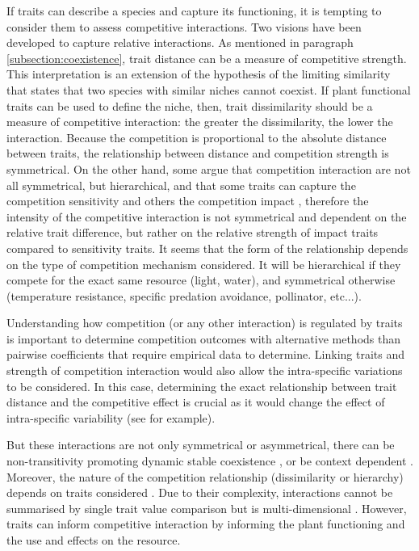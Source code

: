 If traits can describe a species and capture its functioning, it is tempting to consider them to assess competitive interactions. Two visions have been developed to capture relative interactions. As mentioned in paragraph \ref{subsection:coexistence}, trait distance can be a measure of competitive strength. This interpretation is an extension of the hypothesis of the limiting similarity that states that two species with similar niches cannot coexist. If plant functional traits can be used to define the niche, then, trait dissimilarity should be a measure of competitive interaction: the greater the dissimilarity, the lower the interaction. Because the competition is proportional to the absolute distance between traits, the relationship between distance and competition strength is symmetrical. On the other hand, some argue that competition interaction are not all symmetrical, but hierarchical, and that some traits can capture the competition sensitivity and others the competition impact \parencite{kunstler_plant_2016}, therefore the intensity of the competitive interaction is not symmetrical and dependent on the relative trait difference, but rather on the relative strength of impact traits compared to sensitivity traits. It seems that the form of the relationship depends on the type of competition mechanism considered. It will be hierarchical if they compete for the exact same resource (light, water), and symmetrical otherwise (temperature resistance, specific predation avoidance, pollinator, etc...).

Understanding how competition (or any other interaction) is regulated by traits is important to determine competition outcomes with alternative methods than pairwise coefficients that require empirical data to determine. Linking traits and strength of competition interaction would also allow the intra-specific variations to be considered. In this case, determining the exact relationship between trait distance and the competitive effect is crucial as it would change the effect of intra-specific variability (see \citet{hart_how_2016} for example).

But these interactions are not only symmetrical or asymmetrical, there can be non-transitivity promoting dynamic stable coexistence \parencite{levine_beyond_2017}, or be context dependent \parencite{callaway_positive_2002}. Moreover, the nature of the competition relationship (dissimilarity or hierarchy) depends on traits considered \parencite{bennett_reciprocal_2016}. Due to their complexity, interactions cannot be summarised by single trait value comparison but is multi-dimensional \parencite{kraft_plant_2015}. However, traits can inform competitive interaction by informing the plant functioning and the use and effects on the resource.\\

